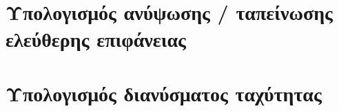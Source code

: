 \documentclass[12pt, a4paper, oneside]{extarticle}
\numberwithin{equation}{subsection}
\begin{document}
		\section{Υπολογισμός ανύψωσης / ταπείνωσης ελεύθερης επιφάνειας}
		\pagestyle{appendix}
		\label{sec:waterLevelPython}
		\lstset{style=withnums}
		
		\cleardoublepage
		\section{Υπολογισμός διανύσματος ταχύτητας}
		\pagestyle{appendix}
		\label{sec:velocityPython}
		\lstset{style=withnums}
		
 
\end{document}
